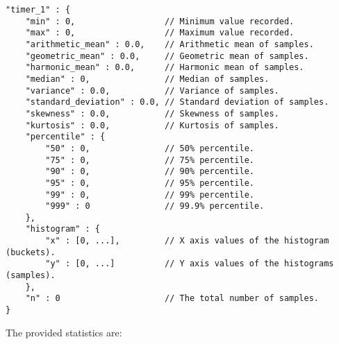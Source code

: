 \documentclass[a4paper]{article}
\begin{document}
\begin{verbatim}
"timer_1" : {
    "min" : 0,                  // Minimum value recorded.
    "max" : 0,                  // Maximum value recorded.
    "arithmetic_mean" : 0.0,    // Arithmetic mean of samples.
    "geometric_mean" : 0.0,     // Geometric mean of samples.
    "harmonic_mean" : 0.0,      // Harmonic mean of samples.
    "median" : 0,               // Median of samples.
    "variance" : 0.0,           // Variance of samples.
    "standard_deviation" : 0.0, // Standard deviation of samples.
    "skewness" : 0.0,           // Skewness of samples.
    "kurtosis" : 0.0,           // Kurtosis of samples.
    "percentile" : {
        "50" : 0,               // 50% percentile.
        "75" : 0,               // 75% percentile.
        "90" : 0,               // 90% percentile.
        "95" : 0,               // 95% percentile.
        "99" : 0,               // 99% percentile.
        "999" : 0               // 99.9% percentile.
    },
    "histogram" : {
        "x" : [0, ...],         // X axis values of the histogram (buckets).
        "y" : [0, ...]          // Y axis values of the histograms (samples).
    },
    "n" : 0                     // The total number of samples.
}
\end{verbatim}




\noindent
The provided statistics are:
\end{document}

